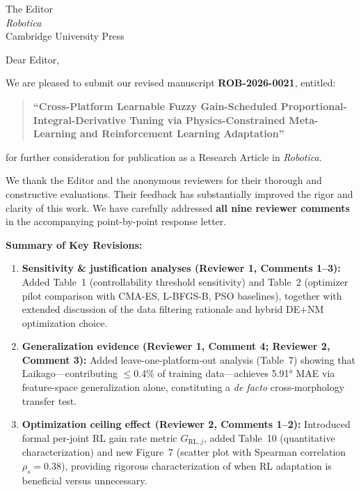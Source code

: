 \documentclass[11pt]{letter}
\date{February 27, 2026}
\begin{document}
\begin{letter}{%
The Editor\\
\textit{Robotica}\\
Cambridge University Press}

\opening{Dear Editor,}

We are pleased to submit our revised manuscript \textbf{ROB-2026-0021}, entitled:

\begin{quote}
\textbf{``Cross-Platform Learnable Fuzzy Gain-Scheduled Proportional-Integral-Derivative Tuning via Physics-Constrained Meta-Learning and Reinforcement Learning Adaptation''}
\end{quote}

\noindent for further consideration for publication as a Research Article in \textit{Robotica}.

We thank the Editor and the anonymous reviewers for their thorough and constructive evaluations. Their feedback has substantially improved the rigor and clarity of this work. We have carefully addressed \textbf{all nine reviewer comments} in the accompanying point-by-point response letter.

\medskip
\noindent\textbf{Summary of Key Revisions:}

\begin{enumerate}
    \item \textbf{Sensitivity \& justification analyses (Reviewer 1, Comments 1--3):} Added Table~1 (controllability threshold sensitivity) and Table~2 (optimizer pilot comparison with CMA-ES, L-BFGS-B, PSO baselines), together with extended discussion of the data filtering rationale and hybrid DE+NM optimization choice.

    \item \textbf{Generalization evidence (Reviewer 1, Comment 4; Reviewer 2, Comment 3):} Added leave-one-platform-out analysis (Table~7) showing that Laikago---contributing $\leq$0.4\% of training data---achieves 5.91° MAE via feature-space generalization alone, constituting a \textit{de facto} cross-morphology transfer test.

    \item \textbf{Optimization ceiling effect (Reviewer 2, Comments 1--2):} Introduced formal per-joint RL gain rate metric $G_{\mathrm{RL},j}$, added Table~10 (quantitative characterization) and new Figure~7 (scatter plot with Spearman correlation $\rho_s = 0.38$), providing rigorous characterization of when RL adaptation is beneficial versus unnecessary.


\end{enumerate}
\end{letter}
\end{document}
